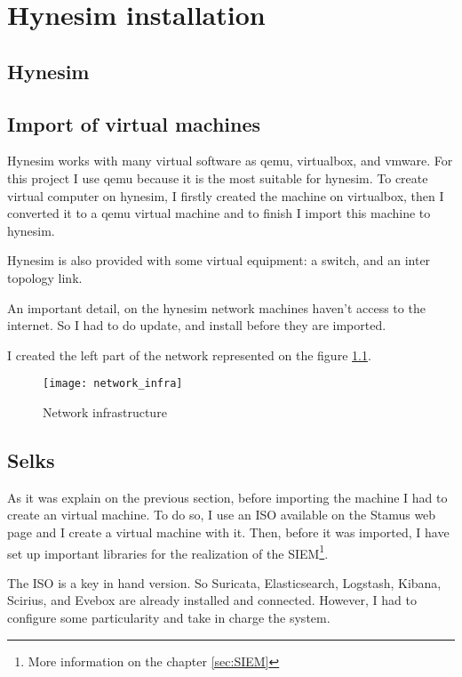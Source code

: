 
\chapter{Hynesim installation}

\section{Hynesim}



\section{Import of virtual machines}

Hynesim works with many virtual software as qemu, virtualbox, and vmware. For this project I use qemu because it is
the most suitable for hynesim. To create virtual computer on hynesim, I firstly created the machine on virtualbox,
then I converted it to a qemu virtual machine and to finish I import this machine to hynesim.

Hynesim is also provided with some virtual equipment: a switch, and an inter topology link.

An important detail, on the hynesim network machines haven't access to the internet. So I had to do update, and
install before they are imported.

I created the left part of the network represented on the figure \ref{fig:network}.


\begin{figure}[h]
  \centering
  \texttt{[image: network\_infra]}
  \caption{Network infrastructure}
  \label{fig:network}
\end{figure}

\section{Selks}

As it was explain on the previous section, before importing the machine I had to create an virtual machine. To do
so, I use an ISO available on the Stamus web page \cite{stamusnetworks:_selks} and I create a virtual machine with
it. Then, before it was imported, I have set up important libraries for the realization of the SIEM\footnote{More
  information on the chapter \ref{sec:SIEM}}.

The ISO is a key in hand version. So Suricata, Elasticsearch, Logstash, Kibana, Scirius, and Evebox are already
installed and connected. However, I had to configure some particularity and take in charge the system.

